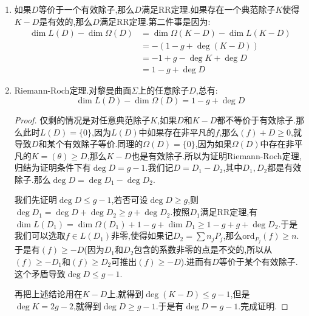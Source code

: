 \begin{enumerate}
\begin{proof}
    	下面设$g\ge1$,由于$g$是$\Omega(\Sigma)$的维数,此时$\Sigma$上就存在非平凡的全纯1形式$\alpha$,于是$\theta/\alpha$是亚纯函数,它的次数就是零,于是$0=\deg(\theta/\alpha)=\deg(\theta)-\deg(\alpha)$.所以问题归结为对全纯1形式$\alpha$有$\deg(\alpha)=2g-2$.此时$K=(\alpha)$是有效除子,由RR定理就有$\dim L(K)-\dim\Omega(K)=1-g+\dim K$.按照第二条,这里$\Omega(K)=L(0)$只由常值函数构成所以维数是1,$L(K)=\Omega(0)$由全纯函数构成所以维数是$g$,于是得到$\deg K=2g-2$.
    \end{proof}
    \item 如果$D$等价于一个有效除子,那么$D$满足RR定理.如果存在一个典范除子$K$使得$K-D$是有效的,那么$D$满足RR定理.第二件事是因为:
    \begin{align*}
        \dim L(D)-\dim\Omega(D)&=\dim\Omega(K-D)-\dim L(K-D)\\&=-(1-g+\deg(K-D))\\&=-1+g-\deg K+\deg D\\&=1-g+\deg D
    \end{align*}
    \item Riemann-Roch定理.对黎曼曲面$\Sigma$上的任意除子$D$,总有:
    $$\dim L(D)-\dim\Omega(D)=1-g+\deg D$$
    \begin{proof}
    	
    	仅剩的情况是对任意典范除子$K$,如果$D$和$K-D$都不等价于有效除子.那么此时$L(D)=\{0\}$,因为$L(D)$中如果存在非平凡的$f$,那么$(f)+D\ge0$,就导致$D$和某个有效除子等价.同理的$\Omega(D)=\{0\}$,因为如果$\Omega(D)$中存在非平凡的$K=(\theta)\ge D$,那么$K-D$也是有效除子.所以为证明Riemann-Roch定理,归结为证明条件下有$\deg D=g-1$.我们记$D=D_1-D_2$,其中$D_1,D_2$都是有效除子.那么$\deg D=\deg D_1-\deg D_2$.
    	
    	\qquad
    	
    	我们先证明$\deg D\le g-1$,若否可设$\deg D\ge g$,则$\deg D_1=\deg D+\deg D_2\ge g+\deg D_2$.按照$D_1$满足RR定理,有$\dim L(D_1)=\dim\Omega(D_1)+1-g+\dim D_1\ge1-g+g+\deg D_2$.于是我们可以选取$f\in L(D_1)$非零,使得如果记$D_2=\sum n_jP_j$,那么$\mathrm{ord}_{P_j}(f)\ge n$.于是有$(f)\ge -D$(因为$D_1$和$D_2$包含的系数非零的点是不交的,所以从$(f)\ge -D_1$和$(f)\ge D_2$可推出$(f)\ge -D$).进而有$D$等价于某个有效除子.这个矛盾导致$\deg D\le g-1$.
    	
    	\qquad
    	
    	再把上述结论用在$K-D$上,就得到$\deg(K-D)\le g-1$,但是$\deg K=2g-2$,就得到$\deg D\ge g-1$.于是有$\deg D=g-1$.完成证明.
    \end{proof}
\end{enumerate}

